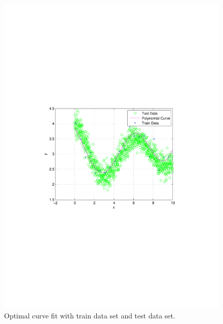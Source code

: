 \documentclass[letterpaper,12pt]{article}
\numberwithin{equation}{section}
\begin{document}
\begin{figure}[H]
\vspace{-5cm}
 
\centering
      \includegraphics[scale=0.8]{1}
\vspace{-8.3cm}
\caption{\label{fig:curve_fitting} 
Optimal curve fit with train data set and test data set.}
       
\end{figure}
\end{document}
